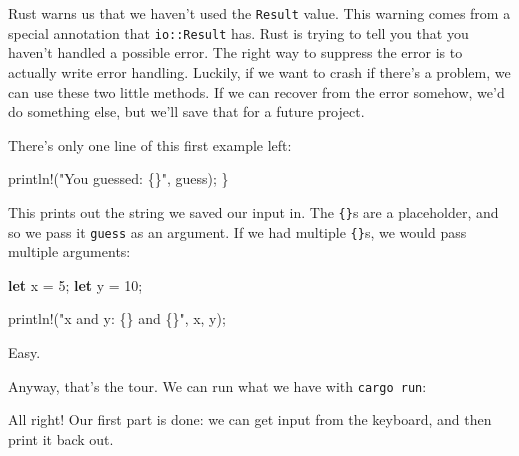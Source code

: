 \documentclass[a4paper,]{book}
\newenvironment{Shaded}{\begin{snugshade}}{\end{snugshade}}
\newcommand{\KeywordTok}[1]{\textcolor[rgb]{0.13,0.29,0.53}{\textbf{{#1}}}}
\newcommand{\DecValTok}[1]{\textcolor[rgb]{0.00,0.00,0.81}{{#1}}}
\newcommand{\StringTok}[1]{\textcolor[rgb]{0.31,0.60,0.02}{{#1}}}
\newcommand{\OtherTok}[1]{\textcolor[rgb]{0.56,0.35,0.01}{{#1}}}
\newcommand{\NormalTok}[1]{{#1}}
\begin{document}
Rust warns us that we haven't used the \texttt{Result} value. This
warning comes from a special annotation that \texttt{io::Result} has.
Rust is trying to tell you that you haven't handled a possible error.
The right way to suppress the error is to actually write error handling.
Luckily, if we want to crash if there's a problem, we can use these two
little methods. If we can recover from the error somehow, we'd do
something else, but we'll save that for a future project.

There's only one line of this first example left:

\begin{Shaded}
\begin{Highlighting}[]
    \OtherTok{println!}\NormalTok{(}\StringTok{"You guessed: \{\}"}\NormalTok{, guess);}
\NormalTok{\}}
\end{Highlighting}
\end{Shaded}

This prints out the string we saved our input in. The \texttt{\{\}}s are
a placeholder, and so we pass it \texttt{guess} as an argument. If we
had multiple \texttt{\{\}}s, we would pass multiple arguments:

\begin{Shaded}
\begin{Highlighting}[]
\KeywordTok{let} \NormalTok{x = }\DecValTok{5}\NormalTok{;}
\KeywordTok{let} \NormalTok{y = }\DecValTok{10}\NormalTok{;}

\OtherTok{println!}\NormalTok{(}\StringTok{"x and y: \{\} and \{\}"}\NormalTok{, x, y);}
\end{Highlighting}
\end{Shaded}

Easy.

Anyway, that's the tour. We can run what we have with
\texttt{cargo\ run}:

\begin{Shaded}
\end{Shaded}

All right! Our first part is done: we can get input from the keyboard,
and then print it back out.
\end{document}
